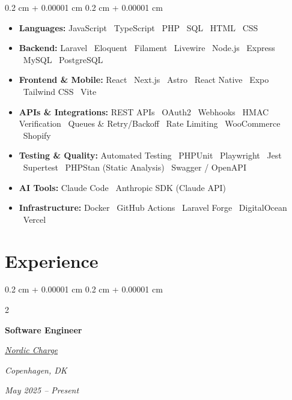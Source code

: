 \documentclass[10pt, letterpaper]{article}
\newenvironment{highlightsforbulletentries}{
    \begin{itemize}[
        topsep=0.10 cm,
        parsep=0.10 cm,
        partopsep=0pt,
        itemsep=0pt,
        leftmargin=10pt
    ]
}{
    \end{itemize}
} %
\newenvironment{onecolentry}{
    \begin{adjustwidth}{
        0.2 cm + 0.00001 cm
    }{
        0.2 cm + 0.00001 cm
    }
}{
    \end{adjustwidth}
} %
\newenvironment{twocolentry}[2][]{
    \onecolentry
    \def\secondColumn{#2}
    \setcolumnwidth{\fill, 4.5 cm}
    \begin{paracol}{2}
}{
    \switchcolumn \raggedleft \secondColumn
    \end{paracol}
    \endonecolentry
} %
\let\hrefWithoutArrow\href
\renewcommand{\href}[2]{\hrefWithoutArrow{#1}{\ifthenelse{\equal{#2}{}}{ }{#2 }\raisebox{.15ex}{\footnotesize \faExternalLink*}}}
\begin{document}
    \begin{onecolentry}
        \begin{highlightsforbulletentries}

        \item \textbf{Languages:} JavaScript \textbar\ TypeScript \textbar\ PHP \textbar\ SQL \textbar\ HTML \textbar\ CSS

        \item \textbf{Backend:} Laravel \textbar\ Eloquent \textbar\ Filament \textbar\ Livewire \textbar\ Node.js \textbar\ Express \textbar\ MySQL \textbar\ PostgreSQL

        \item \textbf{Frontend \& Mobile:} React \textbar\ Next.js \textbar\ Astro \textbar\ React Native \textbar\ Expo \textbar\ Tailwind CSS \textbar\ Vite

        \item \textbf{APIs \& Integrations:} REST APIs \textbar\ OAuth2 \textbar\ Webhooks \textbar\ HMAC Verification \textbar\ Queues \& Retry/Backoff \textbar\ Rate Limiting \textbar\ WooCommerce \textbar\ Shopify

        \item \textbf{Testing \& Quality:} Automated Testing \textbar\ PHPUnit \textbar\ Playwright \textbar\ Jest \textbar\ Supertest \textbar\ PHPStan (Static Analysis) \textbar\ Swagger / OpenAPI

        \item \textbf{AI Tools:} Claude Code \textbar\ Anthropic SDK (Claude API)

        \item \textbf{Infrastructure:} Docker \textbar\ GitHub Actions \textbar\ Laravel Forge \textbar\ DigitalOcean \textbar\ Vercel

        \end{highlightsforbulletentries}
    \end{onecolentry}


    \section{Experience}

        \begin{twocolentry}{
            \textit{Copenhagen, DK}

            \textit{May 2025 – Present}}
            \textbf{Software Engineer}

            \hrefWithoutArrow{https://www.nordiccharge.com/} {\color{black} \hspace*{0.13cm}\textit{Nordic Charge}}
        \end{twocolentry}
\end{document}

